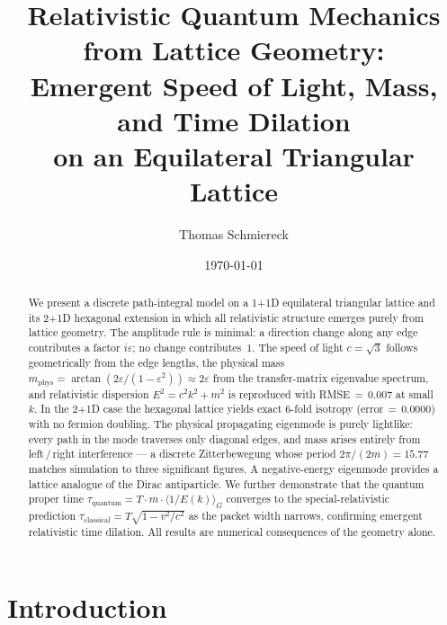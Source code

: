 \documentclass[twocolumn,showpacs,preprintnumbers,amsmath,amssymb]{revtex4-2}
\newcommand{\eps}{\varepsilon}
\newcommand{\mphys}{m_{\mathrm{phys}}}
\newcommand{\tauq}{\tau_{\mathrm{quantum}}}
\newcommand{\taucl}{\tau_{\mathrm{classical}}}
\newcommand{\avg}[1]{\langle #1 \rangle}
\begin{document}
\title{Relativistic Quantum Mechanics from Lattice Geometry:\\
Emergent Speed of Light, Mass, and Time Dilation\\
on an Equilateral Triangular Lattice}

\author{Thomas Schmiereck}

\date{\today}

\begin{abstract}
We present a discrete path-integral model on a \mbox{1\!+\!1D} equilateral
triangular lattice and its \mbox{2\!+\!1D} hexagonal extension in which all
relativistic structure emerges purely from lattice geometry.
The amplitude rule is minimal: a direction change along any edge contributes a
factor $i\eps$; no change contributes~$1$.
The speed of light $c = \sqrt{3}$ follows geometrically from the edge lengths,
the physical mass $\mphys = \arctan(2\eps/(1{-}\eps^2)) \approx 2\eps$ from
the transfer-matrix eigenvalue spectrum, and relativistic dispersion
$E^2 = c^2 k^2 + m^2$ is reproduced with RMSE\,$=\,0.007$ at small~$k$.
In the \mbox{2\!+\!1D} case the hexagonal lattice yields exact 6-fold isotropy
(error\,$=\,0.0000$) with no fermion doubling.
The physical propagating eigenmode is purely lightlike: every path in the
mode traverses only diagonal edges, and mass arises entirely from
left\,/\,right interference --- a discrete Zitterbewegung whose period
$2\pi/(2m) = 15.77$ matches simulation to three significant figures.
A negative-energy eigenmode provides a lattice analogue of the Dirac
antiparticle.
We further demonstrate that the quantum proper time
$\tauq = T \cdot m \cdot \avg{1/E(k)}_G$ converges to the
special-relativistic prediction $\taucl = T\sqrt{1 - v^2/c^2}$
as the packet width narrows, confirming emergent relativistic time dilation.
All results are numerical consequences of the geometry alone.
\end{abstract}

\maketitle

\section{Introduction}
\label{sec:intro}
\end{document}
